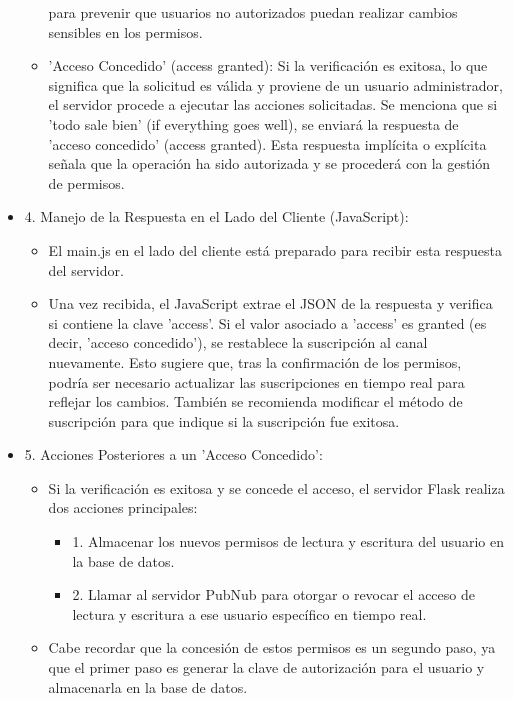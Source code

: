 \documentclass{report}
\begin{document}
\begin{itemize}
\begin{itemize}
            para prevenir que usuarios no autorizados puedan realizar cambios sensibles en los permisos.
            \item 'Acceso Concedido' (access granted): Si la verificación es exitosa, lo que significa que la solicitud es válida y proviene 
            de un usuario administrador, el servidor procede a ejecutar las acciones solicitadas. Se menciona que si 'todo sale bien' 
            (if everything goes well), se enviará la respuesta de 'acceso concedido' (access granted). Esta respuesta implícita o 
            explícita señala que la operación ha sido autorizada y se procederá con la gestión de permisos.
        \end{itemize}
    \item 4. Manejo de la Respuesta en el Lado del Cliente (JavaScript):
        \begin{itemize}
            \item El main.js en el lado del cliente está preparado para recibir esta respuesta del servidor.
            \item Una vez recibida, el JavaScript extrae el JSON de la respuesta y verifica si contiene la clave 'access'. Si el valor 
            asociado a 'access' es granted (es decir, 'acceso concedido'), se restablece la suscripción al canal nuevamente. Esto sugiere 
            que, tras la confirmación de los permisos, podría ser necesario actualizar las suscripciones en tiempo real para reflejar los 
            cambios. También se recomienda modificar el método de suscripción para que indique si la suscripción fue exitosa.
        \end{itemize}
    \item 5. Acciones Posteriores a un 'Acceso Concedido':
        \begin{itemize}
            \item Si la verificación es exitosa y se concede el acceso, el servidor Flask realiza dos acciones principales:
                \begin{itemize}
                    \item 1. Almacenar los nuevos permisos de lectura y escritura del usuario en la base de datos.
                    \item 2. Llamar al servidor PubNub para otorgar o revocar el acceso de lectura y escritura a ese usuario específico en tiempo real.
                \end{itemize}
            \item Cabe recordar que la concesión de estos permisos es un segundo paso, ya que el primer paso es generar la clave de 
            autorización para el usuario y almacenarla en la base de datos.
        \end{itemize}
\end{itemize}
\end{document}
